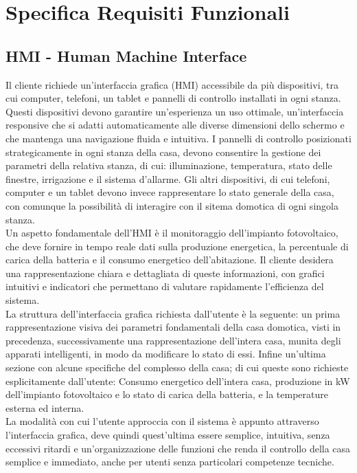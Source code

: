 \documentclass[italian, 12pt, a4paper]{article}
\begin{document}
\section{Specifica Requisiti Funzionali}\label{sec:requisiti2}
\subsection{HMI - Human Machine Interface}
Il cliente richiede un’interfaccia grafica (HMI) accessibile da più dispositivi, tra cui computer, telefoni, un tablet e pannelli di controllo installati in ogni stanza. Questi dispositivi devono garantire un'esperienza un uso ottimale, un'interfaccia responsive che si adatti automaticamente alle diverse dimensioni dello schermo e che mantenga una navigazione fluida e intuitiva.  I pannelli di controllo posizionati strategicamente in ogni stanza della casa, devono consentire la gestione dei parametri della relativa stanza, di cui: illuminazione, temperatura, stato delle finestre, irrigazione e il sistema d’allarme. Gli altri dispositivi, di cui telefoni, computer e un tablet devono invece rappresentare lo stato generale della casa, con comunque la possibilità di interagire con il sitema domotica di ogni singola stanza.\\[1.5mm]
Un aspetto fondamentale dell’HMI è il monitoraggio dell’impianto fotovoltaico, che deve fornire in tempo reale dati sulla produzione energetica, la percentuale di carica della batteria e il consumo energetico dell’abitazione. Il cliente desidera una rappresentazione chiara e dettagliata di queste informazioni, con grafici intuitivi e indicatori che permettano di valutare rapidamente l’efficienza del sistema.\\[1.5mm]
La struttura dell’interfaccia grafica richiesta dall’utente è la seguente: un prima rappresentazione visiva dei parametri fondamentali della casa domotica, visti in precedenza, successivamente una rappresentazione dell’intera casa, munita degli apparati intelligenti, in modo da modificare lo stato di essi. Infine un’ultima sezione con alcune specifiche del complesso della casa; di cui queste sono richieste esplicitamente dall’utente: Consumo energetico dell’intera casa, produzione in kW dell’impianto fotovoltaico e lo stato di carica della batteria, e la temperature esterna ed interna.\\[1.5mm]
La modalità con cui l’utente approccia con il sistema è appunto attraverso l’interfaccia grafica, deve quindi quest’ultima essere semplice, intuitiva, senza eccessivi ritardi e un’organizzazione delle funzioni che renda il controllo della casa semplice e immediato, anche per utenti senza particolari competenze tecniche.
\end{document}
